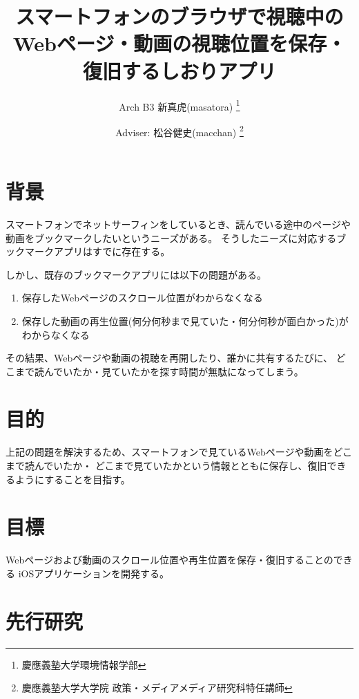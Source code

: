 \documentclass[a4j,10pt]{jsarticle}
\begin{document}

\title{スマートフォンのブラウザで視聴中のWebページ・動画の視聴位置を保存・復旧するしおりアプリ}

\author{
    Arch B3 新真虎(masatora) \thanks{慶應義塾大学環境情報学部}
    \and
    Adviser: 松谷健史(macchan) \thanks{慶應義塾大学大学院 政策・メディアメディア研究科特任講師}
}

\maketitle
\thispagestyle{empty}

\section{背景}
スマートフォンでネットサーフィンをしているとき、読んでいる途中のページや動画をブックマークしたいというニーズがある。
そうしたニーズに対応するブックマークアプリはすでに存在する\cite{Pocket}\cite{instapaper}。

しかし、既存のブックマークアプリには以下の問題がある。
\begin{enumerate}
\item 保存したWebページのスクロール位置がわからなくなる
\item 保存した動画の再生位置(何分何秒まで見ていた・何分何秒が面白かった)がわからなくなる
\end{enumerate}

その結果、Webページや動画の視聴を再開したり、誰かに共有するたびに、
どこまで読んでいたか・見ていたかを探す時間が無駄になってしまう。


\section{目的}
上記の問題を解決するため、スマートフォンで見ているWebページや動画をどこまで読んでいたか・
どこまで見ていたかという情報とともに保存し、復旧できるようにすることを目指す。

\section{目標}
Webページおよび動画のスクロール位置や再生位置を保存・復旧することのできる
iOSアプリケーションを開発する\cite{shiori-web-for-safari}。

\section{先行研究}
\end{document}
